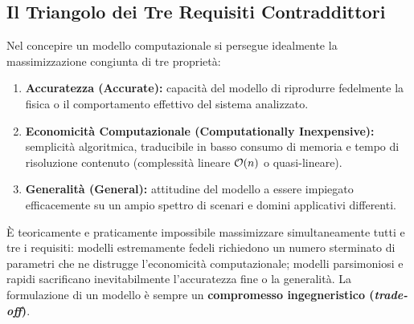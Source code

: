 \subsection{Il Triangolo dei Tre Requisiti Contraddittori}
Nel concepire un modello computazionale si persegue idealmente la massimizzazione congiunta di tre propriet\`a:
\begin{enumerate}
    \item \textbf{Accuratezza (Accurate):} capacit\`a del modello di riprodurre fedelmente la fisica o il comportamento effettivo del sistema analizzato.
    \item \textbf{Economicit\`a Computazionale (Computationally Inexpensive):} semplicit\`a algoritmica, traducibile in basso consumo di memoria e tempo di risoluzione contenuto (complessit\`a lineare $\mathcal{O}\!\left(n\right)$ o quasi-lineare).
    \item \textbf{Generalit\`a (General):} attitudine del modello a essere impiegato efficacemente su un ampio spettro di scenari e domini applicativi differenti.
\end{enumerate}

\begin{property}
\`E teoricamente e praticamente impossibile massimizzare simultaneamente tutti e tre i requisiti: modelli estremamente fedeli richiedono un numero sterminato di parametri che ne distrugge l'economicit\`a computazionale; modelli parsimoniosi e rapidi sacrificano inevitabilmente l'accuratezza fine o la generalit\`a. La formulazione di un modello \`e sempre un \textbf{compromesso ingegneristico (\textit{trade-off})}.
\end{property}

